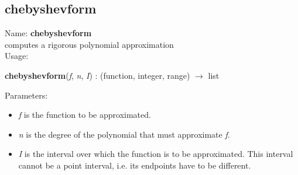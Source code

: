 \subsection{chebyshevform}
\label{labchebyshevform}
\noindent Name: \textbf{chebyshevform}\\
\phantom{aaa}computes a rigorous polynomial approximation \\[0.2cm]
\noindent Usage: 
\begin{center}
\textbf{chebyshevform}(\emph{f}, \emph{n}, \emph{I}) : (\textsf{function}, \textsf{integer}, \textsf{range}) $\rightarrow$ \textsf{list}\\
\end{center}
Parameters: 
\begin{itemize}
\item \emph{f} is the function to be approximated.
\item \emph{n} is the degree of the polynomial that must approximate \emph{f}.
\item \emph{I} is the interval over which the function is to be approximated. This interval cannot be a point interval, i.e. its endpoints have to be different.
\end{itemize}
